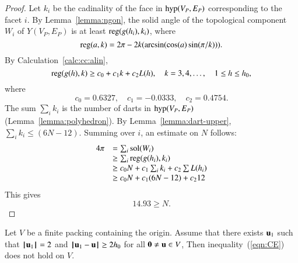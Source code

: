 \begin{proof}
Let $k_i$ be the cadinality of the face in ${\operatorname{hyp}}(V_P,E_P)$ corresponding to the facet $i$.    By Lemma~\ref{lemma:ngon}, the solid angle of the topological component $W_i$ of $Y(V_P,E_P)$ is 
at least ${\operatorname{reg}}(g(h_i),k_i)$, where 
%
%
%
\begin{displaymath}
{\operatorname{reg}}(a,k) = 2\pi - 2 k (\arcsin(\cos(a)\sin(\pi/k))).
\end{displaymath}
By Calculation~\ref{calc:cc:alin}, %
\begin{displaymath}
{\operatorname{reg}}(g(h),k) \ge c_0 + c_1 k + c_2 L(h),\quad
k = 3,4,\ldots,\quad 1\le h\le {h_0},
\end{displaymath}
where
\begin{displaymath}c_0 = 0.6327,\quad c_1 = -0.0333,\quad c_2 = 0.4754.\end{displaymath}
The sum $\sum_i k_i$ is the number of darts in ${\operatorname{hyp}}(V_P,E_P)$ (Lemma~\ref{lemma:polyhedron}).  By Lemma~\ref{lemma:dart-upper}, 
$\sum_i k_i \le (6N-12)$.
Summing over $i$,  an estimate on $N$ follows:
%
%
\begin{displaymath}
\begin{array}{lll}
4\pi &= \sum_i{\operatorname{sol}}(W_i)\\
     &\ge \sum_i {\operatorname{reg}}(g(h_i),k_i) \\
     &\ge c_0 N +c_1\sum_i k_i + c_2 \sum L(h_i)\\
     &\ge c_0 N +c_1 (6N-12) + c_2 12\\
\end{array}
\end{displaymath}
This gives
\begin{displaymath}
14.93 \ge N.
\end{displaymath}
\end{proof} 


\begin{lemma}\label{300}\label{lemma:D'}  
Let $ V$ be a finite packing containing the origin.
Assume that there exists $ {\mathbf u}_1$ such that ${{\hskip0.1em|\hskip-0.15em|\hskip0.1em} {\mathbf u}_1{\hskip0.1em|\hskip-0.15em|\hskip0.1em}}=2$ and
${\hskip0.1em|\hskip-0.15em|\hskip0.1em} {\mathbf u}_1 -  {\mathbf u}{\hskip0.1em|\hskip-0.15em|\hskip0.1em}\ge 2{h_0}$ for all ${\mathbf 0}\ne {\mathbf u}\in V$,
Then  inequality~(\ref{eqn:CE}) does not hold on $ V$.
\end{lemma}

